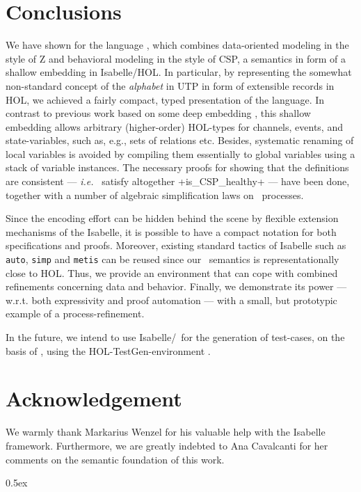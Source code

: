 \documentclass[11pt,a4paper]{article}
\newcommand{\ie}{\textit{i.e.}\ }
\begin{document}
\section{Conclusions}
We have shown for the language \Circus , which combines data-oriented modeling in the style of Z and behavioral modeling in the
style of CSP, a semantics in form of a shallow embedding in Isabelle/HOL. In particular, by representing the somewhat
non-standard concept of the \emph{alphabet} in UTP  in form of extensible 
records in HOL, we achieved a fairly compact, typed presentation of the language. 
In contrast to previous work based on some deep embedding \cite{ZC09}, this shallow embedding allows arbitrary (higher-order) HOL-types for channels, events, and state-variables,
such as, e.g., sets of relations etc. 
Besides, systematic renaming of local variables is avoided by compiling them essentially to global variables using a stack of variable instances. The necessary proofs for
showing that the definitions are consistent --- \ie{} satisfy altogether \inlineisar+is_CSP_healthy+ --- have been done, together with a number
of algebraic simplification laws on \Circus\ processes.
 
Since the encoding effort can be hidden behind the scene by flexible extension mechanisms of the Isabelle, it is possible to have a compact
notation for both specifications and proofs. Moreover, existing standard tactics of Isabelle such as \verb+auto+, \verb+simp+ and \verb+metis+ 
can be reused since our \Circus\ semantics is representationally close to HOL. Thus, we provide an environment that can cope with combined refinements
concerning data and behavior. Finally, we demonstrate its power --- w.r.t. both expressivity and %
proof automation ---
with a small, but prototypic example of a process-refinement. 

In the future, we intend to use Isabelle/\Circus\ for the generation of test-cases, on the basis of \cite{CavalGau:Acta:2011}, using the HOL-TestGen-environment \cite{brucker.ea:theorem-prover:2012}.

\section{Acknowledgement}
We warmly thank Markarius Wenzel for his valuable help with the Isabelle framework. 
Furthermore, we are greatly indebted  to Ana Cavalcanti for her comments on the
semantic foundation of this work.

\newpage

\parindent 0pt\parskip 0.5ex





\end{document}
